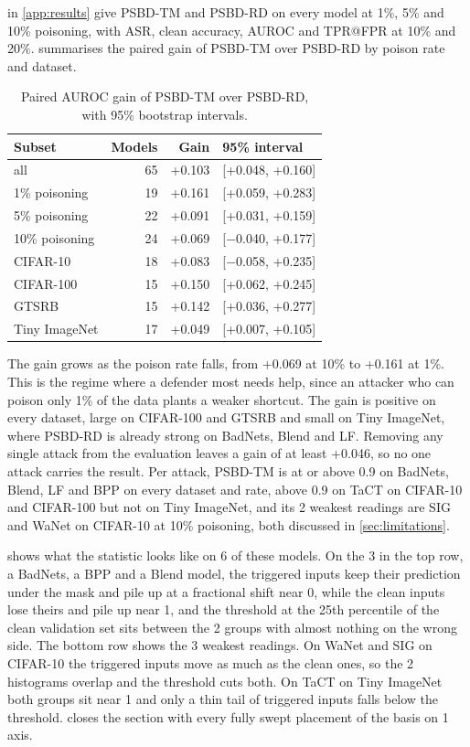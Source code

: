  in \cref{app:results} give PSBD-TM and PSBD-RD on every model at 1\%, 5\% and 10\% poisoning, with ASR, clean accuracy, AUROC and TPR@FPR at 10\% and 20\%.  summarises the paired gain of PSBD-TM over PSBD-RD by poison rate and dataset.

\begin{table}[t]
\centering\small
\caption{Paired AUROC gain of PSBD-TM over PSBD-RD, with 95\% bootstrap intervals.}
\label{tab:gains}
\begin{tabular}{lrrl}
\toprule
Subset & Models & Gain & 95\% interval \\
\midrule
all & 65 & +0.103 & [+0.048, +0.160] \\
\midrule
1\% poisoning & 19 & +0.161 & [+0.059, +0.283] \\
5\% poisoning & 22 & +0.091 & [+0.031, +0.159] \\
10\% poisoning & 24 & +0.069 & [$-$0.040, +0.177] \\
\midrule
CIFAR-10 & 18 & +0.083 & [$-$0.058, +0.235] \\
CIFAR-100 & 15 & +0.150 & [+0.062, +0.245] \\
GTSRB & 15 & +0.142 & [+0.036, +0.277] \\
Tiny ImageNet & 17 & +0.049 & [+0.007, +0.105] \\
\bottomrule
\end{tabular}
\end{table}

The gain grows as the poison rate falls, from +0.069 at 10\% to +0.161 at 1\%. This is the regime where a defender most needs help, since an attacker who can poison only 1\% of the data plants a weaker shortcut. The gain is positive on every dataset, large on CIFAR-100 and GTSRB and small on Tiny ImageNet, where PSBD-RD is already strong on BadNets, Blend and LF. Removing any single attack from the evaluation leaves a gain of at least +0.046, so no one attack carries the result. Per attack, PSBD-TM is at or above 0.9 on BadNets, Blend, LF and BPP on every dataset and rate, above 0.9 on TaCT on CIFAR-10 and CIFAR-100 but not on Tiny ImageNet, and its 2 weakest readings are SIG and WaNet on CIFAR-10 at 10\% poisoning, both discussed in \cref{sec:limitations}.

 shows what the statistic looks like on 6 of these models. On the 3 in the top row, a BadNets, a BPP and a Blend model, the triggered inputs keep their prediction under the mask and pile up at a fractional shift near 0, while the clean inputs lose theirs and pile up near 1, and the threshold at the 25th percentile of the clean validation set sits between the 2 groups with almost nothing on the wrong side. The bottom row shows the 3 weakest readings. On WaNet and SIG on CIFAR-10 the triggered inputs move as much as the clean ones, so the 2 histograms overlap and the threshold cuts both. On TaCT on Tiny ImageNet both groups sit near 1 and only a thin tail of triggered inputs falls below the threshold.  closes the section with every fully swept placement of the basis on 1 axis.

